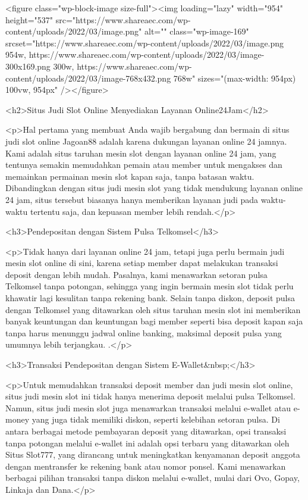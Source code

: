 {<figure class="wp-block-image size-full"><img loading="lazy" width="954" height="537" src="https://www.shareaec.com/wp-content/uploads/2022/03/image.png" alt="" class="wp-image-169" srcset="https://www.shareaec.com/wp-content/uploads/2022/03/image.png 954w, https://www.shareaec.com/wp-content/uploads/2022/03/image-300x169.png 300w, https://www.shareaec.com/wp-content/uploads/2022/03/image-768x432.png 768w" sizes="(max-width: 954px) 100vw, 954px" /></figure>



<h2>Situs Judi Slot Online Menyediakan Layanan Online24Jam</h2>



<p>Hal pertama yang membuat Anda wajib bergabung dan bermain di situs judi slot online Jagoan88 adalah karena dukungan layanan online 24 jamnya. Kami adalah situs taruhan mesin slot dengan layanan online 24 jam, yang tentunya semakin memudahkan pemain atau member untuk mengakses dan memainkan permainan mesin slot kapan saja, tanpa batasan waktu. Dibandingkan dengan situs judi mesin slot yang tidak mendukung layanan online 24 jam, situs tersebut biasanya hanya memberikan layanan judi pada waktu-waktu tertentu saja, dan kepuasan member lebih rendah.</p>



<h3>Pendepositan dengan Sistem Pulsa Telkomsel</h3>



<p>Tidak hanya dari layanan online 24 jam, tetapi juga perlu bermain judi mesin slot online di sini, karena setiap member dapat melakukan transaksi deposit dengan lebih mudah. Pasalnya, kami menawarkan setoran pulsa Telkomsel tanpa potongan, sehingga yang ingin bermain mesin slot tidak perlu khawatir lagi kesulitan tanpa rekening bank. Selain tanpa diskon, deposit pulsa dengan Telkomsel yang ditawarkan oleh situs taruhan mesin slot ini memberikan banyak keuntungan dan keuntungan bagi member seperti bisa deposit kapan saja tanpa harus menunggu jadwal online banking, maksimal deposit pulsa yang umumnya lebih terjangkau. .</p>



<h3>Transaksi Pendepositan dengan Sistem E-Wallet&nbsp;</h3>



<p>Untuk memudahkan transaksi deposit member dan judi mesin slot online, situs judi mesin slot ini tidak hanya menerima deposit melalui pulsa Telkomsel. Namun, situs judi mesin slot juga menawarkan transaksi melalui e-wallet atau e-money yang juga tidak memiliki diskon, seperti kelebihan setoran pulsa. Di antara berbagai metode pembayaran deposit yang ditawarkan, opsi transaksi tanpa potongan melalui e-wallet ini adalah opsi terbaru yang ditawarkan oleh Situs Slot777, yang dirancang untuk meningkatkan kenyamanan deposit anggota dengan mentransfer ke rekening bank atau nomor ponsel. Kami menawarkan berbagai pilihan transaksi tanpa diskon melalui e-wallet, mulai dari Ovo, Gopay, Linkaja dan Dana.</p>



}
